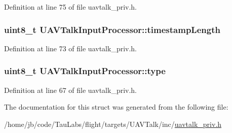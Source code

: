 \-Definition at line 75 of file uavtalk\-\_\-priv.\-h.

\hypertarget{struct_u_a_v_talk_input_processor_ae5fadf5b763839a191f044b2a2492366}{
\subsubsection[{timestamp\-Length}]{\setlength{\rightskip}{0pt plus 5cm}uint8\-\_\-t {\bf \-U\-A\-V\-Talk\-Input\-Processor\-::timestamp\-Length}}}\label{struct_u_a_v_talk_input_processor_ae5fadf5b763839a191f044b2a2492366}


\-Definition at line 73 of file uavtalk\-\_\-priv.\-h.

\hypertarget{struct_u_a_v_talk_input_processor_a65de259b3813b2be47d056480622bcbc}{
\subsubsection[{type}]{\setlength{\rightskip}{0pt plus 5cm}uint8\-\_\-t {\bf \-U\-A\-V\-Talk\-Input\-Processor\-::type}}}\label{struct_u_a_v_talk_input_processor_a65de259b3813b2be47d056480622bcbc}


\-Definition at line 67 of file uavtalk\-\_\-priv.\-h.



\-The documentation for this struct was generated from the following file\-:\begin{DoxyCompactItemize}
\item 
/home/jb/code/\-Tau\-Labs/flight/targets/\-U\-A\-V\-Talk/inc/\hyperlink{uavtalk__priv_8h}{uavtalk\-\_\-priv.\-h}\end{DoxyCompactItemize}
